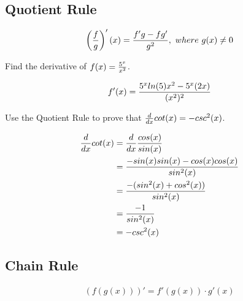\subsection{Quotient Rule}

\begin{theorem}
    \begin{align}
        \left({f \over g}\right)'(x) = {f'g - fg' \over g^2},\ where\ g(x) \neq 0
    \end{align}
\end{theorem}

\begin{exercise}\nonumber
    Find the derivative of $ f(x) = {5^x \over x^2} $.

    \begin{align}
        f'(x) = {5^xln(5)x^2 - 5^x(2x) \over (x^2)^2}
    \end{align}
\end{exercise}

\begin{exercise}\nonumber
    Use the Quotient Rule to prove that $ {d \over dx}cot(x) = -csc^2(x) $.

    \begin{align}
        {d \over dx}cot(x) & = {d \over dx}{cos(x) \over sin(x)}             \\
                           & = {-sin(x)sin(x) - cos(x)cos(x) \over sin^2(x)} \\
                           & = {-(sin^2(x) + cos^2(x)) \over sin^2(x)}       \\
                           & = {-1 \over sin^2(x)}                           \\
                           & = -csc^2(x)
    \end{align}
\end{exercise}

\subsection{Chain Rule}

\begin{theorem}
    \begin{align}
        (f(g(x)))' = f'(g(x)) \cdot g'(x)
    \end{align}
\end{theorem}

